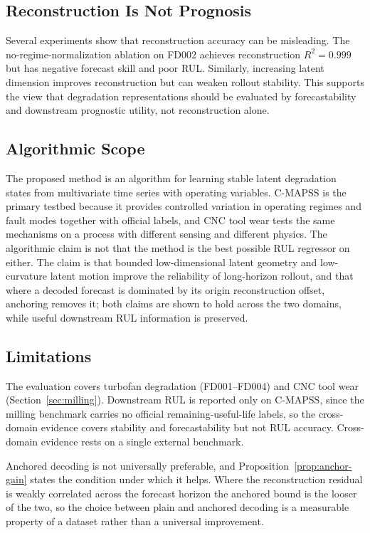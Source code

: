 \documentclass[a4paper,fleqn]{cas-sc}
\begin{document}
\subsection{Reconstruction Is Not Prognosis}

Several experiments show that reconstruction accuracy can be misleading. The
no-regime-normalization ablation on FD002 achieves reconstruction $R^2=0.999$
but has negative forecast skill and poor RUL. Similarly, increasing latent
dimension improves reconstruction but can weaken rollout stability. This
supports the view that degradation representations should be evaluated by
forecastability and downstream prognostic utility, not reconstruction alone.

\subsection{Algorithmic Scope}

The proposed method is an algorithm for learning stable latent degradation
states from multivariate time series with operating variables. C-MAPSS is the
primary testbed because it provides controlled variation in operating regimes
and fault modes together with official labels, and CNC tool wear tests the same
mechanisms on a process with different sensing and different physics. The
algorithmic claim is not that the method is the best possible RUL regressor on
either. The claim is that bounded low-dimensional latent geometry and
low-curvature latent motion improve the reliability of long-horizon rollout,
and that where a decoded forecast is dominated by its origin reconstruction
offset, anchoring removes it; both claims are shown to hold across the two
domains, while useful downstream RUL information is preserved.

\subsection{Limitations}

The evaluation covers turbofan degradation (FD001--FD004) and CNC tool wear
(Section~\ref{sec:milling}). Downstream RUL is reported only on C-MAPSS, since
the milling benchmark carries no official remaining-useful-life labels, so the
cross-domain evidence covers stability and forecastability but not RUL
accuracy. Cross-domain evidence rests on a single external benchmark.

Anchored decoding is not universally preferable, and
Proposition~\ref{prop:anchor-gain} states the condition under which it helps.
Where the reconstruction residual is weakly correlated across the forecast
horizon the anchored bound is the looser of the two, so the choice between
plain and anchored decoding is a measurable property of a dataset rather than a
universal improvement.
\end{document}
